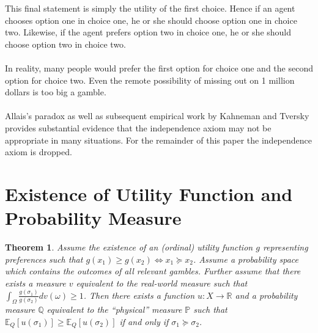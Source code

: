 \documentclass{article}
\newtheorem{theorem}{Theorem}
\begin{document}
This final statement is simply the utility of the first choice.  Hence if an agent chooses option one in choice one, he or she should choose option one in choice two.  Likewise, if the agent prefers option two in choice one, he or she should choose option two in choice two.
\\
\\
In reality, many people would prefer the first option for choice one and the second option for choice two.  Even the remote possibility of missing out on 1 million dollars is too big a gamble. 
\\
\\
Allais's paradox as well as subsequent empirical work by Kahneman and Tversky provides substantial evidence that the independence axiom may not be appropriate in many situations.  For the remainder of this paper the independence axiom is dropped.  

 
\section{Existence of Utility Function and Probability Measure}

\begin{theorem} \label{theorem1}
Assume the existence of an (ordinal) utility function \(g\) representing preferences such that \(g(x_1)\geq g(x_2) \Leftrightarrow x_1 \succeq x_2 \).  Assume a probability space which contains the outcomes of all relevant gambles.  Further assume that there exists a measure \(v\) equivalent to the real-world measure such that \(\int_\Omega \frac{g(\sigma_1)}{g(\sigma_2)} dv(\omega)\geq 1\).  Then there exists a function \(u: X \to \mathbb{R}\) and a probability measure \(\mathbb{Q}\) equivalent to the ``physical'' measure \(\mathbb{P}\) such that \(\mathbb{E}_Q\left[u(\sigma_1)\right] \geq \mathbb{E}_Q\left[u(\sigma_2)\right]\) if and only if \(\sigma_1 \succeq \sigma_2\).  
\end{theorem} %
\end{document}
